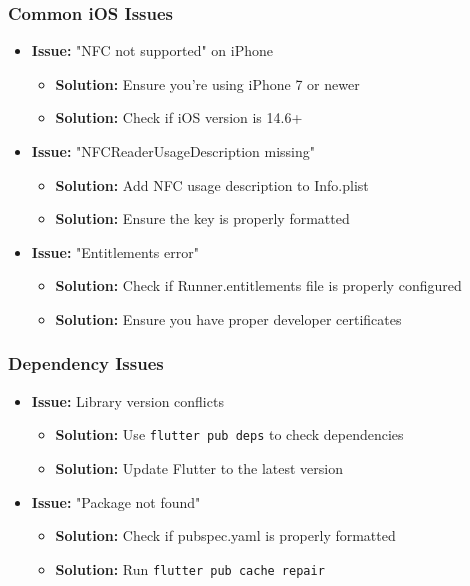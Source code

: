 \documentclass[a4paper,12pt]{article}
\begin{document}
\subsubsection{Common iOS Issues}
\begin{itemize}
    \item \textbf{Issue:} "NFC not supported" on iPhone
    \begin{itemize}
        \item \textbf{Solution:} Ensure you're using iPhone 7 or newer
        \item \textbf{Solution:} Check if iOS version is 14.6+
    \end{itemize}
    
    \item \textbf{Issue:} "NFCReaderUsageDescription missing"
    \begin{itemize}
        \item \textbf{Solution:} Add NFC usage description to Info.plist
        \item \textbf{Solution:} Ensure the key is properly formatted
    \end{itemize}
    
    \item \textbf{Issue:} "Entitlements error"
    \begin{itemize}
        \item \textbf{Solution:} Check if Runner.entitlements file is properly configured
        \item \textbf{Solution:} Ensure you have proper developer certificates
    \end{itemize}
\end{itemize}

\subsubsection{Dependency Issues}
\begin{itemize}
    \item \textbf{Issue:} Library version conflicts
    \begin{itemize}
        \item \textbf{Solution:} Use \texttt{flutter pub deps} to check dependencies
        \item \textbf{Solution:} Update Flutter to the latest version
    \end{itemize}
    
    \item \textbf{Issue:} "Package not found"
    \begin{itemize}
        \item \textbf{Solution:} Check if pubspec.yaml is properly formatted
        \item \textbf{Solution:} Run \texttt{flutter pub cache repair}
    \end{itemize}
\end{itemize}
\end{document}
